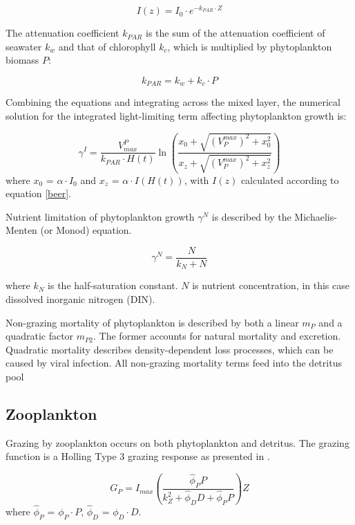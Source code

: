 \documentclass[journal abbreviation, manuscript]{copernicus}
\begin{document}
\begin{equation}
    I(z) = I_0 \cdot e^{-k_{PAR} \cdot Z} \label{beer}
\end{equation}

The attenuation coefficient $k_{PAR}$ is the sum of the attenuation coefficient of seawater $k_w$ and that of chlorophyll $k_c$, which is multiplied by phytoplankton biomass $P$:

\begin{equation}
    k_{PAR} = k_w + k_c \cdot P
\end{equation}

Combining the equations and integrating across the mixed layer, the numerical solution for the integrated light-limiting term affecting phytoplankton growth is:

\begin{equation}
    \gamma^I = \frac{V^P_{max}}{k_{PAR} \cdot H(t)} \ln{ \left( \frac{ x_0+\sqrt{(V^{max}_P)^2+x_0^2} }{ x_z+\sqrt{(V^{max}_P)^2+x_z^2} } \right)}
\end{equation}
where $x_0$ = $\alpha \cdot I_0$ and $x_z$ = $\alpha \cdot I(H(t))$, with $I(z)$ calculated according to equation \eqref{beer}.

Nutrient limitation of phytoplankton growth $\gamma^N$ is described by the Michaelis-Menten (or Monod) equation.

\begin{equation}
    \gamma^N = \frac{N}{k_N + N}
\end{equation}

where $k_N$ is the half-saturation constant. $N$ is nutrient concentration, in this case dissolved inorganic nitrogen (DIN).

Non-grazing mortality of phytoplankton is described by both a linear $m_P$ and a quadratic factor $m_{P2}$. The former accounts for natural mortality and excretion. Quadratic mortality describes density-dependent loss processes, which can be caused by viral infection. All non-grazing mortality terms feed into the detritus pool

\subsection{Zooplankton}
Grazing by zooplankton occurs on both phytoplankton and detritus. The grazing function is a Holling Type 3 grazing response as presented in \citet{Anderson2015c}.

\begin{equation}
    G_P = I_{max} \left( \frac{ \hat{\phi}_P P}{k_Z^2 + \hat{\phi}_D D +\hat{\phi}_P P}  \right) Z
\end{equation}
where $\hat{\phi}_P$ = $\phi_P \cdot P$, $\hat{\phi}_D$ = $\phi_D \cdot D$.
\end{document}
